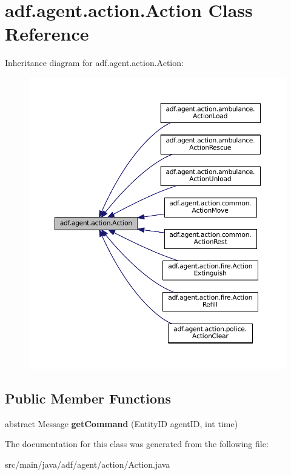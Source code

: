 \hypertarget{classadf_1_1agent_1_1action_1_1Action}{}\section{adf.\+agent.\+action.\+Action Class Reference}
\label{classadf_1_1agent_1_1action_1_1Action}


Inheritance diagram for adf.\+agent.\+action.\+Action\+:
\nopagebreak
\begin{figure}[H]
\begin{center}
\leavevmode
\includegraphics[width=350pt]{classadf_1_1agent_1_1action_1_1Action__inherit__graph}
\end{center}
\end{figure}
\subsection*{Public Member Functions}
\begin{DoxyCompactItemize}
\item 
\hypertarget{classadf_1_1agent_1_1action_1_1Action_afc2cef4d52ee76566ee518bab9d5f145}{}\label{classadf_1_1agent_1_1action_1_1Action_afc2cef4d52ee76566ee518bab9d5f145} 
abstract Message {\bfseries get\+Command} (Entity\+ID agent\+ID, int time)
\end{DoxyCompactItemize}


The documentation for this class was generated from the following file\+:\begin{DoxyCompactItemize}
\item 
src/main/java/adf/agent/action/Action.\+java\end{DoxyCompactItemize}
